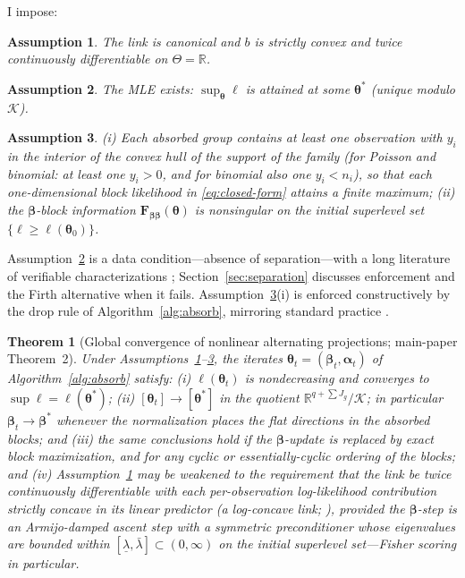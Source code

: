 \documentclass[11pt]{article}
\newtheorem{theorem}{Theorem}
\newtheorem{assumption}{Assumption}
\newcommand{\R}{\mathbb{R}}
\newcommand{\bbeta}{\bm{\beta}}
\newcommand{\btheta}{\bm{\theta}}
\newcommand{\balpha}{\bm{\alpha}}
\newcommand{\bF}{\mathbf{F}}
\begin{document}
I impose:

\begin{assumption}\label{ass:canonical}
The link is canonical and $b$ is strictly convex and twice continuously
differentiable on $\Theta = \R$.
\end{assumption}

\begin{assumption}\label{ass:mle-exists}
The MLE exists: $\sup_{\btheta} \ell$ is attained at some
$\btheta^\ast$ (unique modulo $\mathcal{K}$).
\end{assumption}

\begin{assumption}\label{ass:blocks}
(i) Each absorbed group contains at least one observation with $y_i$ in
the interior of the convex hull of the support of the family (for
Poisson and binomial: at least one $y_i > 0$, and for binomial also one
$y_i < n_i$), so that each one-dimensional block likelihood in
\eqref{eq:closed-form} attains a finite maximum; (ii) the $\bbeta$-block
information $\bF_{\bbeta\bbeta}(\btheta)$ is nonsingular on the initial
superlevel set $\{\ell \ge \ell(\btheta_0)\}$.
\end{assumption}

Assumption~\ref{ass:mle-exists} is a data condition---absence of
separation---with a long literature of verifiable characterizations
\citep{haberman1974,wedderburn1976,albert1984,santossilva2010,correia2019};
Section~\ref{sec:separation} discusses enforcement and the Firth
alternative when it fails.  Assumption~\ref{ass:blocks}(i) is enforced
constructively by the drop rule of Algorithm~\ref{alg:absorb}, mirroring
standard practice \citep{correia2020}.

\begin{theorem}[Global convergence of nonlinear alternating
projections; main-paper Theorem~2]\label{thm:global}
Under Assumptions~\ref{ass:canonical}--\ref{ass:blocks}, the iterates
$\btheta_t = (\bbeta_t, \balpha_t)$ of Algorithm~\ref{alg:absorb}
satisfy: (i) $\ell(\btheta_t)$ is nondecreasing and converges to
$\sup \ell = \ell(\btheta^\ast)$; (ii) $[\btheta_t] \to [\btheta^\ast]$
in the quotient $\R^{q+\sum J_g}/\mathcal{K}$; in particular
$\bbeta_t \to \bbeta^\ast$ whenever the normalization places the flat
directions in the absorbed blocks; and (iii) the same conclusions hold if
the $\bbeta$-update is replaced by exact block maximization, and for any
cyclic or essentially-cyclic ordering of the blocks; and (iv)
Assumption~\ref{ass:canonical} may be weakened to the requirement that
the link be twice continuously differentiable with each per-observation
log-likelihood contribution strictly concave in its linear predictor
(a \emph{log-concave link}; \citealp{pratt1981}), provided the
$\bbeta$-step is an Armijo-damped ascent step with a symmetric
preconditioner whose eigenvalues are bounded within $[\underline\lambda,
\bar\lambda] \subset (0,\infty)$ on the initial superlevel
set---Fisher scoring in particular.
\end{theorem}
\end{document}

